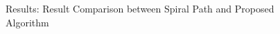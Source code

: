 \documentclass[conference]{IEEEtran}
\begin{document}
\begin{figure}[h!]
\centering
\caption{Results: Result Comparison between Spiral Path and Proposed Algorithm}
\vspace{-0.1in}
\label{res1}
 \end{figure}
\end{document}
